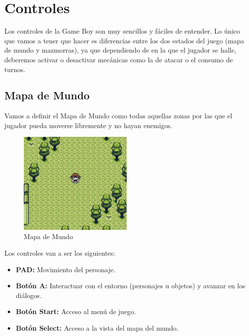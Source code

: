 \clearpage

\section{Controles}

Los controles de la Game Boy son muy sencillos y fáciles de entender. Lo único que vamos a tener que hacer es diferencias entre los dos estados del juego (mapa de mundo y mazmorras), ya que dependiendo de en la que el jugador se halle, deberemos activar o desactivar mecánicas como la de atacar o el consumo de turnos.

\subsection{Mapa de Mundo}

Vamos a definir el Mapa de Mundo como todas aquellas zonas por las que el jugador pueda moverse libremente y no hayan enemigos.

\begin{figure}[h]
\centering
\includegraphics[width=0.5\textwidth]{include/images/gdd/overworld.png}
\caption{Mapa de Mundo}
\label{figure:overworld}
\end{figure}

Los controles van a ser los siguientes:

\begin{itemize}
	\item \textbf{PAD:} Movimiento del personaje.
	\item \textbf{Botón A:} Interactuar con el entorno (personajes u objetos) y avanzar en los diálogos.
	\item \textbf{Botón Start:} Acceso al menú de juego.
	\item \textbf{Botón Select:} Acceso a la vista del mapa del mundo.
\end{itemize}

\clearpage

